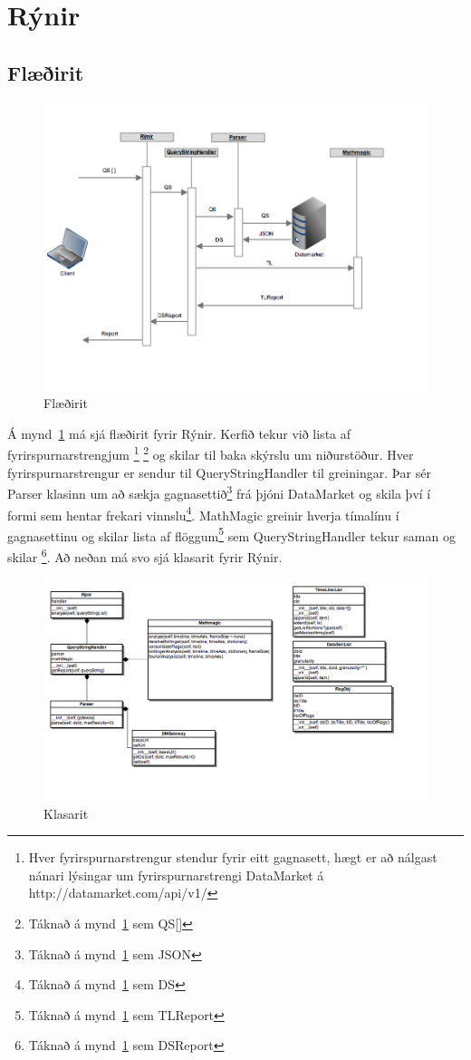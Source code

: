 \documentclass{article}
\begin{document}
\newpage
\section{Rýnir}
\subsection{Flæðirit}
\label{sec:flow_chart}

\begin{figure}[H]
  \centering
  \includegraphics[width=.85\textwidth]{rynir_sequence-2.png} 
  \caption{Flæðirit} 
  \label{fig:sequence}
\end{figure}
Á mynd~\ref{fig:sequence} má sjá flæðirit fyrir Rýnir.
Kerfið tekur við lista af fyrirspurnarstrengjum
\footnote[1]{Hver fyrirspurnarstrengur stendur fyrir eitt gagnasett, hægt er að nálgast nánari lýsingar um fyrirspurnarstrengi DataMarket á http://datamarket.com/api/v1/}
\footnote[2]{Táknað á mynd~\ref{fig:sequence} sem QS[]} 
og skilar til baka skýrslu um niðurstöður. Hver fyrirspurnarstrengur er sendur til QueryStringHandler til greiningar.
Þar sér Parser klasinn um að sækja gagnasettið\footnote[3]{Táknað á mynd~\ref{fig:sequence} sem JSON} frá þjóni DataMarket
og skila því í formi sem hentar frekari vinnslu\footnote[4]{Táknað á mynd~\ref{fig:sequence} sem DS}.
MathMagic greinir hverja tímalínu í gagnasettinu og skilar lista af flöggum\footnote[4]{Táknað á mynd~\ref{fig:sequence} sem TLReport} 
sem QueryStringHandler tekur saman og skilar \footnote[4]{Táknað á mynd~\ref{fig:sequence} sem DSReport}.
Að neðan má svo sjá klasarit fyrir Rýnir.

\begin{figure}[H]
  \centering
  \includegraphics[width=.95\textwidth]{rynir_class_diagram.png} 
  \caption{Klasarit} 
\end{figure}
\newpage
\end{document}
